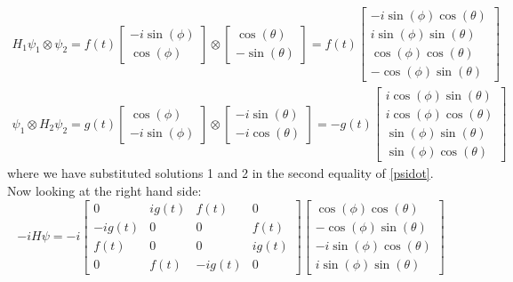 \documentclass[11pt]{article}
\begin{document}
\begin{align}
    H_1\psi_1 \otimes \psi_2 = f(t)\begin{bmatrix} -i\sin(\phi)\\ \cos(\phi) \end{bmatrix} \otimes
                                   \begin{bmatrix} \cos(\theta)\\ -\sin(\theta) \end{bmatrix} =
                               f(t)\begin{bmatrix} -i\sin(\phi)\cos(\theta)\\ i\sin(\phi)\sin(\theta)\\
                                                   \cos(\phi)\cos(\theta)\\ -\cos(\phi)\sin(\theta)\end{bmatrix}\\
    \psi_1 \otimes H_2\psi_2 = g(t)\begin{bmatrix} \cos(\phi)\\ -i\sin(\phi) \end{bmatrix} \otimes
                                    \begin{bmatrix}-i\sin(\theta)\\ -i\cos(\theta) \end{bmatrix} =
                                -g(t)\begin{bmatrix} i\cos(\phi)\sin(\theta)\\ i\cos(\phi)\cos(\theta)\\
                                                    \sin(\phi)\sin(\theta)\\\sin(\phi)\cos(\theta)\end{bmatrix}
\end{align}
where we have substituted solutions 1 and 2 in the second equality of \eqref{psidot}.  Now looking at the right hand side:
\begin{equation}
    -iH\psi = -i\begin{bmatrix} 0 & ig(t) & f(t) & 0\\
                                 -ig(t) & 0 & 0 & f(t)\\
                                f(t) & 0 & 0 & ig(t)\\
                                0 & f(t) & -ig(t) & 0\end{bmatrix}
                \begin{bmatrix} \cos(\phi)\cos(\theta)\\
                                -\cos(\phi)\sin(\theta)\\
                                -i\sin(\phi)\cos(\theta)\\
                                i\sin(\phi)\sin(\theta)\end{bmatrix}
\end{equation}
\end{document}
